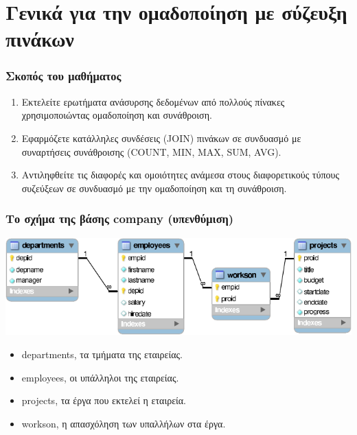 \section[]{\textgreek{Γενικά για την ομαδοποίηση με σύζευξη πινάκων}}


\begin{frame}
\frametitle{Σκοπός του μαθήματος}
\begin{minipage}{\wE}
\begin{enumerate} \itemsep 9pt %
  \item Εκτελείτε ερωτήματα ανάσυρσης δεδομένων από πολλούς πίνακες
        χρησιμοποιώντας {\crr ομαδοποίηση και συνάθροιση}.
  \item Εφαρμόζετε κατάλληλες συνδέσεις ({\sq JOIN}) πινάκων σε συνδυασμό 
        με συναρτήσεις συνάθροισης ({\sq COUNT, MIN, MAX, SUM, AVG}).        
  \item Αντιληφθείτε τις διαφορές και ομοιότητες ανάμεσα στους διαφορετικούς τύπους
        συζεύξεων σε συνδυασμό με την {\crr ομαδοποίηση} και τη {\crr συνάθροιση}.
\end{enumerate}
\end{minipage}
\end{frame}


\begin{frame}
\frametitle{Το σχήμα της βάσης {\en company} (υπενθύμιση)}
\begin{minipage}{\wE}
\includegraphics[scale=0.9]{../common/companyREL.pdf}
\vspace{0.5cm}
\begin{itemize} \itemsep 6pt
  \item {\ra departments}, τα τμήματα της εταιρείας.
  \item {\ra employees}, οι υπάλληλοι της εταιρείας.
  \item {\ra projects}, τα έργα που εκτελεί η εταιρεία.
  \item {\ra workson}, η απασχόληση των υπαλλήλων στα έργα.
\end{itemize}
\end{minipage}
\end{frame}
